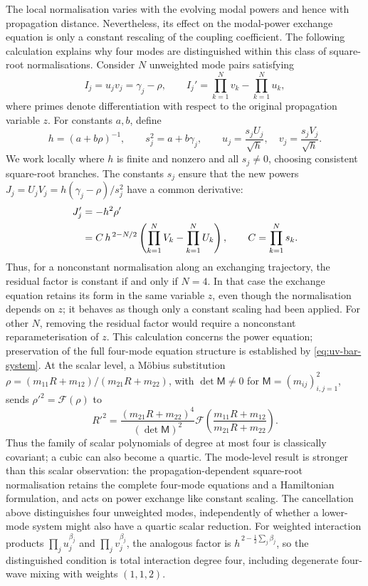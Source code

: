 \documentclass[11pt,a4paper]{article}
\numberwithin{equation}{section}
\begin{document}
The local normalisation varies with the evolving modal powers and hence with propagation distance.
Nevertheless, its effect on the modal-power exchange equation is only a constant rescaling of the coupling coefficient.
The following calculation explains why four modes are distinguished within this class of square-root normalisations.
Consider $N$ unweighted mode pairs satisfying
\begin{equation}
I_j=u_jv_j=\gamma_j-\rho,\qquad
I_j'=\prod_{k=1}^{N}v_k-\prod_{k=1}^{N}u_k,
\label{eq:N-mode-power-exchange}
\end{equation}
where primes denote differentiation with respect to the original propagation variable $z$.
For constants $a,b$, define
\begin{equation}
h=(a+b\rho)^{-1},\qquad s_j^2=a+b\gamma_j,\qquad
u_j=\frac{s_jU_j}{\sqrt h},\quad
v_j=\frac{s_jV_j}{\sqrt h}.
\label{eq:N-mode-local-normalisation}
\end{equation}
We work locally where $h$ is finite and nonzero and all $s_j\ne0$, choosing consistent square-root branches.
The constants $s_j$ ensure that the new powers $J_j=U_jV_j=h(\gamma_j-\rho)/s_j^2$ have a common derivative:
\begin{align}
J_j'&=-h^2\rho' \notag\\
&=C\,h^{\,2-N/2}
\left(\prod_{k=1}^{N}V_k-\prod_{k=1}^{N}U_k\right),
\qquad C=\prod_{k=1}^{N}s_k.
\label{eq:N-mode-normalised-exchange}
\end{align}
Thus, for a nonconstant normalisation along an exchanging trajectory, the residual factor is constant if and only if $N=4$.
In that case the exchange equation retains its form in the same variable $z$, even though the normalisation depends on $z$; it behaves as though only a constant scaling had been applied.
For other $N$, removing the residual factor would require a nonconstant reparameterisation of $z$.
This calculation concerns the power equation; preservation of the full four-mode equation structure is established by \eqref{eq:uv-bar-system}.
At the scalar level, a M\"obius substitution $\rho=(m_{11}R+m_{12})/(m_{21}R+m_{22})$, with $\det\mathsf M\ne0$ for $\mathsf M=(m_{ij})_{i,j=1}^2$, sends $\rho'^2=\mathcal F(\rho)$ to
\begin{equation}
R'^2=\frac{(m_{21}R+m_{22})^4}{(\det\mathsf M)^2}\mathcal F\!\left(\frac{m_{11}R+m_{12}}{m_{21}R+m_{22}}\right).
\end{equation}
Thus the family of scalar polynomials of degree at most four is classically covariant; a cubic can also become a quartic.
The mode-level result is stronger than this scalar observation: the propagation-dependent square-root normalisation retains the complete four-mode equations and a Hamiltonian formulation, and acts on power exchange like constant scaling.
The cancellation above distinguishes four unweighted modes, independently of whether a lower-mode system might also have a quartic scalar reduction.
For weighted interaction products $\prod_j u_j^{\beta_j}$ and $\prod_j v_j^{\beta_j}$, the analogous factor is $h^{\,2-\frac12\sum_j\beta_j}$, so the distinguished condition is total interaction degree four, including degenerate four-wave mixing with weights $(1,1,2)$.
\end{document}
